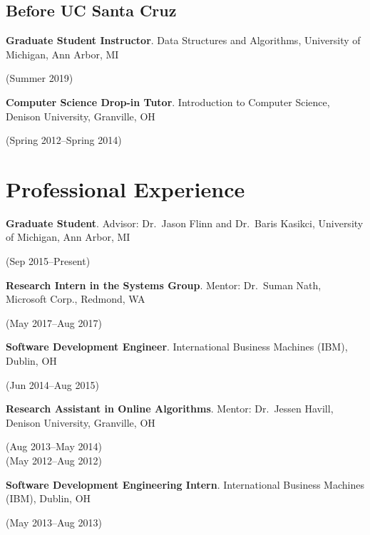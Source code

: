 \documentclass[letterpaper,10pt]{article}
\newcommand{\sidebyside}[2]{
  \begin{minipage}[t]{.75\textwidth}
    \raggedright{}
    #2
  \end{minipage}
  \hspace{.01\textwidth}
    \begin{minipage}[t]{.205\textwidth}
    \raggedleft
    #1
  \end{minipage}
}
\newcommand{\trio}[3]{\sidebyside{#3}{\textbf{#1}. #2}}
\begin{document}
\subsection{Before UC Santa Cruz}
\begin{smenumerate}
\item\trio{Graduate Student Instructor}{Data Structures and Algorithms,
  University of Michigan, Ann Arbor, MI}{(Summer 2019)}
\item\trio{Computer Science Drop-in Tutor}{Introduction to Computer Science,
  Denison University, Granville, OH}{(Spring 2012--Spring 2014)}
\end{smenumerate}


\section{Professional Experience}
\begin{smenumerate}
\item\trio{Graduate Student}{Advisor: Dr.\ Jason Flinn and Dr.\ Baris Kasikci,
  University of Michigan, Ann Arbor, MI}{(Sep 2015--Present)}

\item\trio{Research Intern in the Systems Group}{Mentor: Dr.\ Suman Nath,
  Microsoft Corp., Redmond, WA}{(May 2017--Aug 2017)}

\item\trio{Software Development Engineer}{International Business Machines (IBM),
  Dublin, OH}{(Jun 2014--Aug 2015)}

\item\trio{Research Assistant in Online Algorithms}{Mentor: Dr.\ Jessen Havill,
  Denison University, Granville, OH}{(Aug 2013--May 2014)\\(May 2012--Aug 2012)}

\item\trio{Software Development Engineering Intern}{International Business
  Machines (IBM), Dublin, OH}{(May 2013--Aug 2013)}

\end{smenumerate}
\end{document}
